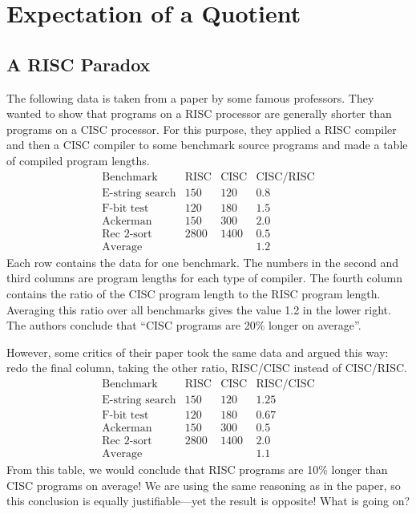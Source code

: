 \section{Expectation of a Quotient}

\subsection{A RISC Paradox}

The following data is taken from a paper by some famous professors.  They
wanted to show that programs on a RISC processor are generally shorter
than programs on a CISC processor.  For this purpose, they applied a RISC
compiler and then a CISC compiler to some benchmark source programs and
made a table of compiled program lengths.
\[
\begin{array}{lccc}
\text{Benchmark}        & \text{RISC}   & \text{CISC}   & \text{CISC/RISC}\\
\hline
\text{E-string search}  & 150           & 120           & 0.8 \\
\text{F-bit test}       & 120           & 180           & 1.5 \\
\text{Ackerman}         & 150           & 300           & 2.0 \\
\text{Rec 2-sort}       & 2800          & 1400          & 0.5 \\
\hline
\text{Average}          &               &               & 1.2
\end{array}
\]
Each row contains the data for one benchmark.  The numbers in the second
and third columns are program lengths for each type of compiler.  The
fourth column contains the ratio of the CISC program length to the RISC
program length.  Averaging this ratio over all benchmarks gives the value
1.2 in the lower right.  The authors conclude that ``CISC programs are
20\% longer on average''.

However, some critics of their paper took the same data and argued this
way: redo the final column, taking the other ratio, RISC/CISC instead of
CISC/RISC.
\[
\begin{array}{lccc}
\text{Benchmark}        & \text{RISC}   & \text{CISC}   & \text{RISC/CISC}\\
\hline
\text{E-string search}  & 150           & 120           & 1.25 \\
\text{F-bit test}       & 120           & 180           & 0.67 \\
\text{Ackerman}         & 150           & 300           & 0.5 \\
\text{Rec 2-sort}       & 2800          & 1400          & 2.0 \\
\hline
\text{Average}          &               &               & 1.1
\end{array}
\]
From this table, we would conclude that RISC programs are 10\% longer
than CISC programs on average!  We are using the same reasoning as in
the paper, so this conclusion is equally justifiable---yet the result
is opposite!  What is going on?

